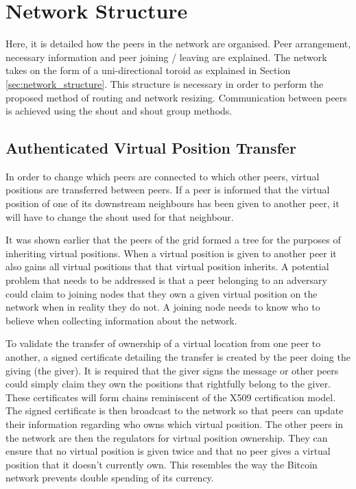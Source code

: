 \documentclass[ %
                    author={Luke Murray},
                supervisor={Dr. Simon Hollis},
                     title={Shadow Peer-to-Peer Networks},
                  subtitle={},
                    degree={MEng},
                      year={2013} ]{thesis}
\begin{document}
\section{Network Structure}

Here, it is detailed how the peers in the network are organised. Peer arrangement, necessary information and peer joining / leaving are explained. The network takes on the form of a uni-directional toroid as explained in Section \ref{sec:network_structure}. This structure is necessary in order to perform the proposed method of routing and network resizing. Communication between peers is achieved using the shout and shout group methods.

\subsection{Authenticated Virtual Position Transfer}

In order to change which peers are connected to which other peers, virtual positions are transferred between peers. If a peer is informed that the virtual position of one of its downstream neighbours has been given to another peer, it will have to change the shout used for that neighbour.

It was shown earlier that the peers of the grid formed a tree for the purposes of inheriting virtual positions. When a virtual position is given to another peer it also gains all virtual positions that that virtual position inherits. A potential problem that needs to be addressed is that a peer belonging to an adversary could claim to joining nodes that they own a given virtual position on the network when in reality they do not. A joining node needs to know who to believe when collecting information about the network.

To validate the transfer of ownership of a virtual location from one peer to another, a signed certificate detailing the transfer is created by the peer doing the giving (the giver). It is required that the giver signs the message or other peers could simply claim they own the positions that rightfully belong to the giver. These certificates will form chains reminiscent of the X509 certification model\cite{recommendation2005509}. The signed certificate is then broadcast to the network so that peers can update their information regarding who owns which virtual position. The other peers in the network are then the regulators for virtual position ownership. They can ensure that no virtual position is given twice and that no peer gives a virtual position that it doesn't currently own. This resembles the way the Bitcoin network prevents double spending of its currency.
\end{document}
